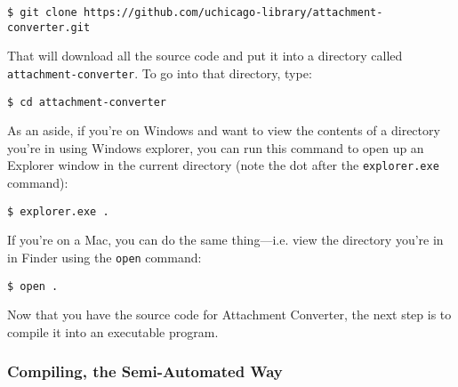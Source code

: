 \documentclass[11pt]{article}
\begin{document}
\begin{verbatim}
$ git clone https://github.com/uchicago-library/attachment-converter.git
\end{verbatim}

That will download all the source code and put it into a directory
called \texttt{attachment-converter}.  To go into that directory, type:

\begin{verbatim}
$ cd attachment-converter
\end{verbatim}

As an aside, if you're on Windows and want to view the contents of a
directory you're in using Windows explorer, you can run this command
to open up an Explorer window in the current directory (note the dot
after the \texttt{explorer.exe} command):

\begin{verbatim}
$ explorer.exe .
\end{verbatim}

If you're on a Mac, you can do the same thing---i.e. view the
directory you're in in Finder using the \texttt{open} command:

\begin{verbatim}
$ open .
\end{verbatim}

Now that you have the source code for Attachment Converter, the next
step is to compile it into an executable program.

\subsubsection{Compiling, the Semi-Automated Way}
\label{sec:org08c0d89}
\end{document}
